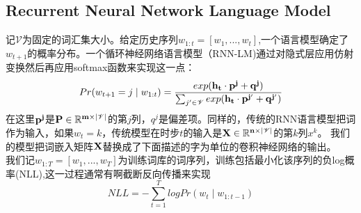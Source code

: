\subsection{Recurrent Neural Network Language Model}
记$\mathscr{V}$为固定的词汇集大小。给定历史序列$w_{1:t}=[w_{1},...,w_{t}]$,一个语言模型确定了$w_{t+1}$的概率分布。一个循环神经网络语言模型（RNN-LM)通过对隐式层应用仿射变换然后再应用softmax函数来实现这一点：\\
\begin{equation}
Pr(w_{t+1}=j\mid w_{1:t}) = \frac{exp(\bf{h}_{t}\cdot \bf{p}^{j}+q^{j})}{\sum_{j^{\prime} \in \mathscr{V}} exp(\bf{h}_{t}\cdot\bf{p}^{j^{\prime}}+q^{j^{\prime}})}
\end{equation}
在这里$\bf{p}^{j}$是$\bf{P} \in {\mathbb{R}}^{m \times |  \mathscr{V} |}$的第$j$列，$q^j$是偏差项。同样的，传统的RNN语言模型把词作为输入，如果$w_{t} = k$，传统模型在时步$t$的输入是$\bf{X} \in \mathbb{R}^{n \times | \mathscr{V} |}$的第$k$列$x^{k}$。
我们的模型把词嵌入矩阵$\bf{X}$替换成了下面描述的字为单位的卷积神经网络的输出。\\
我们记$w_{1:T}=[w_{1},...,w_{T}]$为训练词库的词序列，训练包括最小化该序列的负log概率(NLL),这一过程通常有啊截断反向传播来实现
\begin{equation}
NLL = - \sum_{t=1}^{T}logPr(w_t \mid w_{1:t-1})
\end{equation}
